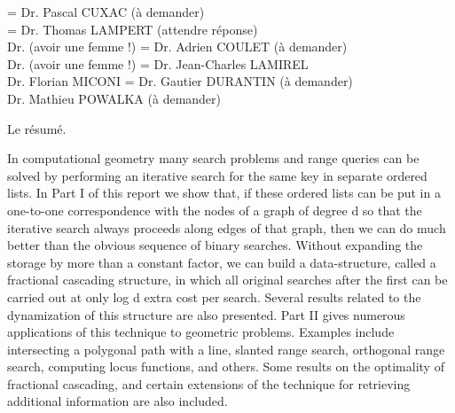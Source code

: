\documentclass[11pt]{template/thesul}
\begin{document}


\ThesisUL

\President={
    Dr. Pascal CUXAC (à demander)\\
}
\Rapporteurs ={
    Dr. Thomas LAMPERT (attendre réponse)\\
    Dr. (avoir une femme !)
}
\Examinateurs={
    Dr. Adrien COULET (à demander)\\
    Dr. (avoir une femme !)
}
\Encadrants={
    Dr. Jean-Charles LAMIREL\\
    Dr. Florian MICONI
}
\Invites={
    Dr. Gautier DURANTIN (à demander)\\
    Dr. Mathieu POWALKA (à demander)
}

\MakeThesisTitlePage



\NumberAbstractPages
\begin{ThesisAbstract}

    \begin{FrenchAbstract}
        Le résumé.
    \end{FrenchAbstract}

    \begin{EnglishAbstract}
        In computational geometry many search problems and range queries can be solved by performing an iterative search for the same key in separate ordered lists.  In Part I of this report we show that, if these ordered lists can be put in a one-to-one correspondence with the nodes of a graph of degree  d  so that the iterative search always proceeds along edges of that graph, then we can do much better than the obvious sequence of binary searches. Without expanding the storage by more than a constant factor, we can build a data-structure, called a fractional cascading structure, in which all original searches after the first can be carried out at only  log d  extra cost per search.  Several results related to the dynamization of this structure are also presented. Part II gives  numerous applications of this technique to geometric problems.
        Examples include intersecting a polygonal path with a line, slanted range search, orthogonal range search, computing locus functions, and others. Some results on the optimality of fractional cascading, and certain extensions of the technique for retrieving additional information are also included.
    \end{EnglishAbstract}
\end{ThesisAbstract}
\end{document}
